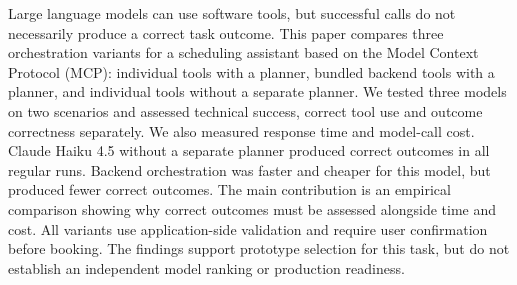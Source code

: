 Large language models can use software tools, but successful calls do not necessarily produce a correct task outcome.
This paper compares three orchestration variants for a scheduling assistant based on the Model Context Protocol (MCP): individual tools with a planner, bundled backend tools with a planner, and individual tools without a separate planner.
We tested three models on two scenarios and assessed technical success, correct tool use and outcome correctness separately.
We also measured response time and model-call cost.
Claude Haiku 4.5 without a separate planner produced correct outcomes in all regular runs.
Backend orchestration was faster and cheaper for this model, but produced fewer correct outcomes.
The main contribution is an empirical comparison showing why correct outcomes must be assessed alongside time and cost.
All variants use application-side validation and require user confirmation before booking.
The findings support prototype selection for this task, but do not establish an independent model ranking or production readiness.
